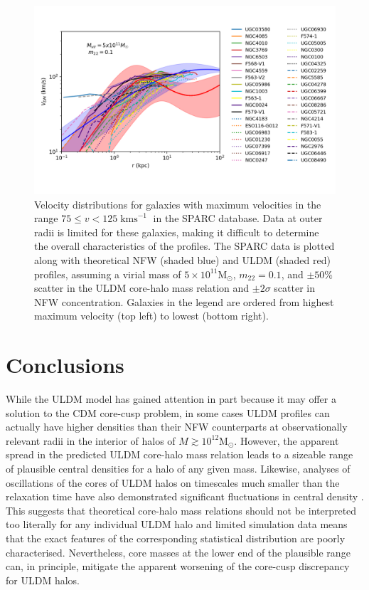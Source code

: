 \documentclass{pasa}%
\begin{document}
\begin{figure}[t]
\centering
\includegraphics[scale=0.9, trim={0.5cm 1cm 0cm 1cm}]{000_vs_SPARC_5_10_11.png}
\caption{Velocity distributions for galaxies with maximum velocities in the range $75 \leq v < 125\operatorname{kms}^{-1}$ in the SPARC database. Data at outer radii is limited for these galaxies, making it difficult to determine the overall characteristics of the profiles. The SPARC data is plotted along with theoretical NFW (shaded blue) and ULDM (shaded red) profiles, assuming a virial mass of $5\times10^{11} \mathrm{M}_{\odot}$, $m_{22} = 0.1$, and $\pm 50 \%$ scatter in the ULDM core-halo mass relation and $\pm2\sigma$ scatter in NFW concentration. Galaxies in the legend are ordered from highest maximum velocity (top left) to lowest (bottom right).}\label{fig:low_v}
\end{figure}



\section{Conclusions}\label{sec:conclusion}

While the ULDM model has gained attention in part because it may offer a solution to the CDM core-cusp problem, in some cases ULDM profiles can actually have higher densities than their NFW counterparts at observationally relevant radii in the interior of halos of $M \gtrsim 10^{12} \mathrm{M}_{\odot}$. However,  the apparent spread in the predicted ULDM core-halo mass relation \cite{Schive:2014hza} leads to a sizeable range of plausible central densities for a halo of any given mass. Likewise, analyses of oscillations of the cores of ULDM halos on timescales much smaller than the relaxation time have also demonstrated significant fluctuations in central density \cite{Veltmaat:2018dfz}. This suggests that theoretical core-halo mass relations should not be interpreted too literally for any individual ULDM halo and limited simulation data means that the exact features of the corresponding statistical distribution are poorly characterised. Nevertheless, core masses at the lower end of the plausible range can, in principle, mitigate the apparent worsening of the core-cusp discrepancy for ULDM halos.  
\end{document}
